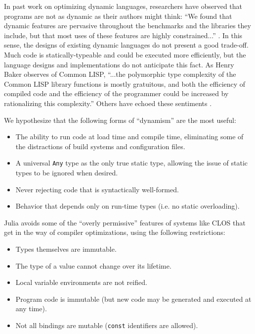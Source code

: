 \documentclass[9pt]{sigplanconf}
\begin{document}
In past work on optimizing dynamic languages, researchers have observed that
programs are not as dynamic as their authors might think:
``We found that dynamic
features are pervasive throughout the benchmarks and the libraries they
include, but that most uses of these features are highly constrained...''
\cite{profileguided}. In this sense, the designs of existing dynamic languages
do not present a good trade-off. Much code is statically-typeable and could be
executed more efficiently, but the language designs and implementations do not
anticipate this fact. As Henry Baker observes of Common LISP, ``...the
polymorphic type complexity of the Common LISP library functions is mostly
gratuitous, and both the efficiency of compiled code and the efficiency of the
programmer could be increased by rationalizing this complexity.''\cite{nimble}
Others have echoed these sentiments \cite{lispcrit}.

We hypothesize that the following forms of ``dynamism'' are the most useful:

\begin{itemize}
\item The ability to run code at load time and compile time, eliminating
some of the distractions of build systems and configuration files.
\item A universal {\tt Any} type as the only true static type,
allowing the issue of static types to be ignored when desired.
\item Never rejecting code that is syntactically well-formed.
\item Behavior that depends only on run-time types (i.e. no static overloading).
\end{itemize}

Julia avoids some of the ``overly permissive'' features of systems like
CLOS \cite{clostrophobia} that get in the way of compiler optimizations,
using the following restrictions:

\begin{itemize}
\item Types themselves are immutable.
\item The type of a value cannot change over its lifetime.
\item Local variable environments are not reified.
\item Program code is immutable (but new code may be generated and executed at any time).
\item Not all bindings are mutable ({\tt const} identifiers are allowed).
\end{itemize}
\end{document}
